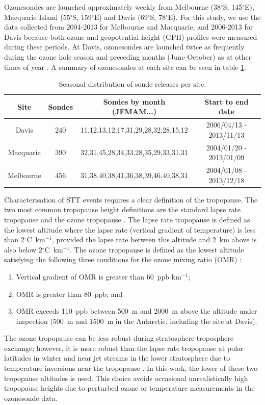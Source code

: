 \documentclass{article}
\begin{document}
    Ozonesondes are launched approximately weekly from Melbourne (38$^{\circ}$S, 145$^{\circ}$E), Macquarie Island (55$^{\circ}$S, 159$^{\circ}$E) and Davis (69$^{\circ}$S, 78$^{\circ}$E). 
    For this study, we use the data collected from 2004-2013 for Melbourne and Macquarie, and 2006-2013 for Davis because both ozone and geopotential height (GPH) profiles were measured during these periods.
    At Davis, ozonesondes are launched twice as frequently during the ozone hole season and preceding months (June-October) as at other times of year \citep{Alexander2013}.
    A summary of ozonesondes at each site can be seen in table \ref{table:sondesummary}.
    
    \begin{table}[htbp!]
      \centering
      \caption{Seasonal distribution of sonde releases per site.}
      \begin{tabular}{| c | c | c | c |} 
	\hline
	Site & Sondes & Sondes by month (JFMAM...) & Start to end date \\
	\hline
	Davis     & 240 & 11,12,13,12,17,31,29,28,32,28,15,12 & 2006/04/13 - 2013/11/13  \\ 
	Macquarie & 390 & 32,31,45,28,34,33,28,35,29,33,31,31 & 2004/01/20 - 2013/01/09 \\
	Melbourne & 456 & 31,38,40,38,41,36,38,39,46,40,38,31 & 2004/01/08 - 2013/12/18 \\
	\hline
      \end{tabular}
      \label{table:sondesummary}
    \end{table}
    
    Characterisation of STT events requires a clear definition of the tropopause.
    The two most common tropopause height definitions are the standard lapse rate tropopause \citep{WMO1957} and the ozone tropopause \citep{Bethan1996}.
    The lapse rate tropopause is defined as the lowest altitude where the lapse rate (vertical gradient of temperature) is less than 2$^\circ$C~km$^{-1}$, provided the lapse rate between this altitude and 2~km above is also below 2$^\circ$C~km$^{-1}$.
    The ozone tropopause is defined as the lowest altitude satisfying the following three conditions for the ozone mixing ratio (OMR) \citep{Bethan1996}:
    \begin{enumerate}
      \item Vertical gradient of OMR is greater than 60~ppb km$^{-1}$;
      \item OMR is greater than 80~ppb; and
      \item OMR exceeds 110~ppb between 500~m and 2000~m above the altitude under inspection (500~m and 1500~m in the Antarctic, including the site at Davis).
    \end{enumerate}
    The ozone tropopause can be less robust during stratosphere-troposphere exchange; however, it is more robust than the lapse rate tropopause at polar latitudes in winter and near jet streams in the lower stratosphere due to temperature inversions near the tropopause \citep{Bethan1996, Tomikawa2009, Alexander2013}.
    In this work, the lower of these two tropopause altitudes is used. 
    This choice avoids occasional unrealistically high tropopause heights due to perturbed ozone or temperature measurements in the ozonesonde data.
    
\end{document}
